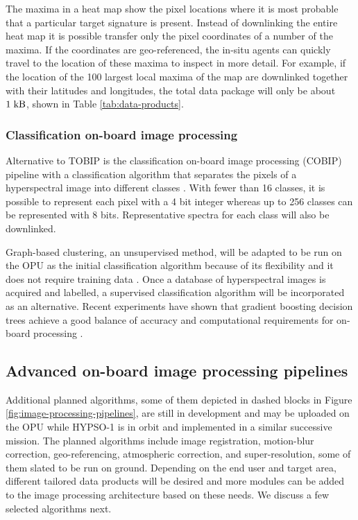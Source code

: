 The maxima in a heat map show the pixel locations where it is most probable that a particular target signature is present. Instead of downlinking the entire heat map it is possible transfer only the pixel coordinates of a number of the maxima. If the coordinates are geo-referenced, the in-situ agents can quickly travel to the location of these maxima to inspect in more detail. For example, if the location of the 100 largest local maxima of the map are downlinked together with their latitudes and longitudes, the total data package will only be about $1 \hspace{3pt} \rm{kB}$, shown in Table \ref{tab:data-products}. %
\subsubsection{Classification on-board image processing}
Alternative to TOBIP is the classification on-board image processing (COBIP) pipeline with a classification algorithm that separates the pixels of a hyperspectral image into different classes \cite{Alcolea_2020}. With fewer than 16 classes, it is possible to represent each pixel with a 4 bit integer whereas up to 256 classes can be represented with 8 bits. Representative spectra for each class will also be downlinked. 

Graph-based clustering, an unsupervised method, will be adapted to be run on the OPU as the initial classification algorithm because of its flexibility and it does not require training data \cite{Wang2017}.
Once a database of hyperspectral images is acquired and labelled, a supervised classification algorithm will be incorporated as an alternative.
Recent experiments have shown that gradient boosting decision trees achieve a good balance of accuracy and computational requirements for on-board processing \cite{Alcolea_2020}.
\subsection{Advanced on-board image processing pipelines}
Additional planned algorithms, some of them depicted in dashed blocks in Figure \ref{fig:image-processing-pipelines}, are still in development and may be uploaded on the OPU while HYPSO-1 is in orbit and implemented in a similar successive mission. 
The planned algorithms include image registration, motion-blur correction, geo-referencing, atmospheric correction, and super-resolution, some of them slated to be run on ground. 
Depending on the end user and target area, different tailored data products will be desired and more modules can be added to the image processing architecture based on these needs. We discuss a few selected algorithms next.

